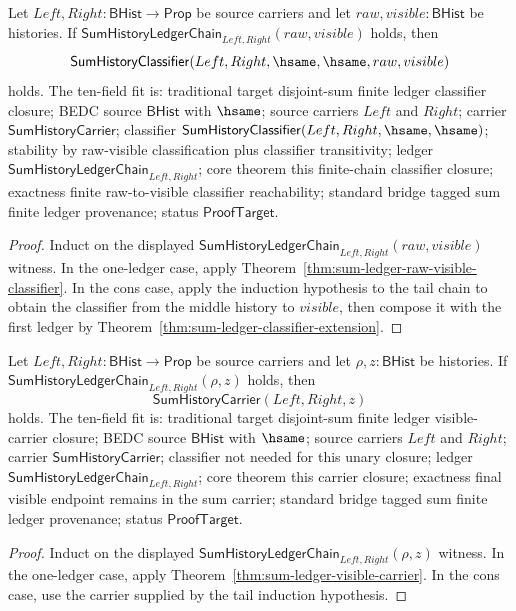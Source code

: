 \begin{theorem}
\label{thm:sum-ledger-chain-classifier-composition}
\label{thm:sum-history-ledger-chain-classifier-composition}
Let $Left,Right:\mathsf{BHist}\to\mathsf{Prop}$ be source carriers and let
$raw,visible:\mathsf{BHist}$ be histories. If
$\mathsf{SumHistoryLedgerChain}_{Left,Right}(raw,visible)$ holds, then
$$
\mathsf{SumHistoryClassifier}(Left,Right,\hsame,\hsame,raw,visible)
$$
holds. The ten-field fit is: traditional target disjoint-sum finite ledger
classifier closure; BEDC source $\mathsf{BHist}$ with $\hsame$; source carriers
$Left$ and $Right$; carrier $\mathsf{SumHistoryCarrier}$; classifier
$\mathsf{SumHistoryClassifier}(Left,Right,\hsame,\hsame)$; stability by
raw-visible classification plus classifier transitivity; ledger
$\mathsf{SumHistoryLedgerChain}_{Left,Right}$; core theorem this finite-chain
classifier closure; exactness finite raw-to-visible classifier reachability;
standard bridge tagged sum finite ledger provenance; status
$\mathsf{ProofTarget}$.
\end{theorem}
\begin{proof}
Induct on the displayed
$\mathsf{SumHistoryLedgerChain}_{Left,Right}(raw,visible)$ witness. In the
one-ledger case, apply
Theorem~\ref{thm:sum-ledger-raw-visible-classifier}. In the cons case, apply
the induction hypothesis to the tail chain to obtain the classifier from the
middle history to $visible$, then compose it with the first ledger by
Theorem~\ref{thm:sum-ledger-classifier-extension}.
\end{proof}

\begin{theorem}
\label{thm:sum-ledger-chain-visible-carrier}
Let $Left,Right:\mathsf{BHist}\to\mathsf{Prop}$ be source carriers and let
$\rho,z:\mathsf{BHist}$ be histories. If
$\mathsf{SumHistoryLedgerChain}_{Left,Right}(\rho,z)$ holds, then
$$
\mathsf{SumHistoryCarrier}(Left,Right,z)
$$
holds. The ten-field fit is: traditional target disjoint-sum finite ledger
visible-carrier closure; BEDC source $\mathsf{BHist}$ with $\hsame$; source
carriers $Left$ and $Right$; carrier $\mathsf{SumHistoryCarrier}$; classifier
not needed for this unary closure; ledger
$\mathsf{SumHistoryLedgerChain}_{Left,Right}$; core theorem this carrier
closure; exactness final visible endpoint remains in the sum carrier; standard
bridge tagged sum finite ledger provenance; status $\mathsf{ProofTarget}$.
\end{theorem}
\begin{proof}
Induct on the displayed
$\mathsf{SumHistoryLedgerChain}_{Left,Right}(\rho,z)$ witness. In the
one-ledger case, apply Theorem~\ref{thm:sum-ledger-visible-carrier}. In the
cons case, use the carrier supplied by the tail induction hypothesis.
\end{proof}

